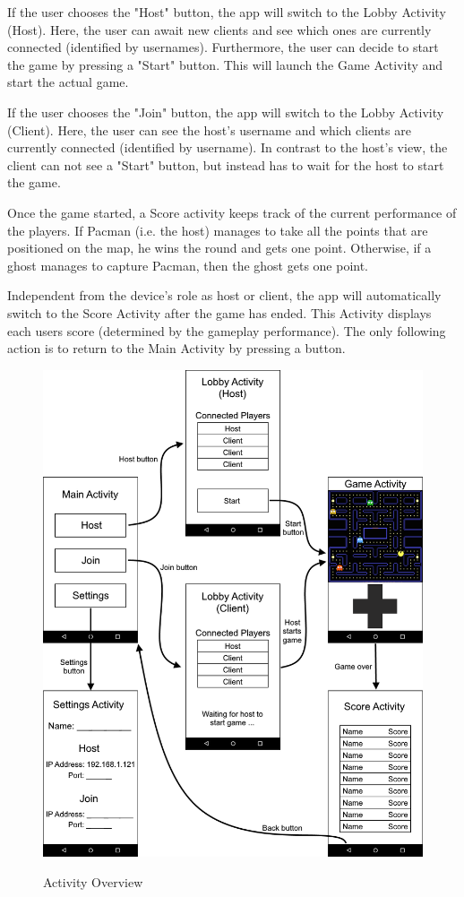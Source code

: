 \documentclass{report}
\newcommand{\lfig}[1]{\label{fig:#1}}
\begin{document}
If the user chooses the "Host" button, the app will switch to the Lobby Activity (Host).
Here, the user can await new clients and see which ones are currently connected (identified by usernames).
Furthermore, the user can decide to start the game by pressing a "Start" button.
This will launch the Game Activity and start the actual game.

If the user chooses the "Join" button, the app will switch to the Lobby Activity (Client).
Here, the user can see the host's username and which clients are currently connected (identified by username).
In contrast to the host's view, the client can not see a "Start" button, but instead has to wait for the host to start the game.

Once the game started, a Score activity keeps track of the current performance of the players. 
If Pacman (i.e. the host) manages to take all the points that are positioned on the map, he wins the round and gets one point. 
Otherwise, if a ghost manages to capture Pacman, then the ghost gets one point. 

Independent from the device's role as host or client, the app will automatically switch to the Score Activity after the game has ended.
This Activity displays each users score (determined by the gameplay performance).
The only following action is to return to the Main Activity by pressing a button. 
 
\begin{figure} [ht!]
	\centering
    \includegraphics[width=\columnwidth]{overview.png}
    \lfig{activity-overview}
    \vspace{-5mm} %
	\caption{Activity Overview}
\end{figure}
\end{document}
